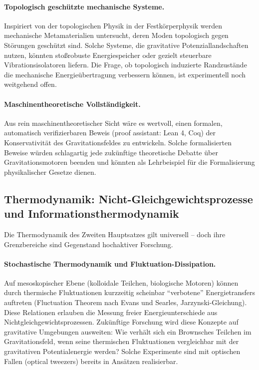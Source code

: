 ﻿\documentclass[12pt, a4paper]{report}
\theoremstyle{definition}
\theoremstyle{remark}
\begin{document}
\paragraph{Topologisch geschützte mechanische Systeme.}
Inspiriert von der topologischen Physik in der Festkörperphysik werden
mechanische Metamaterialien untersucht, deren Moden topologisch gegen
Störungen geschützt sind. Solche Systeme, die gravitative Potenziallandschaften
nutzen, könnten stoßrobuste Energiespeicher oder gezielt steuerbare
Vibrationsisolatoren liefern. Die Frage, ob topologisch induzierte
Randzustände die mechanische Energieübertragung verbessern können, ist
experimentell noch weitgehend offen.

\paragraph{Maschinentheoretische Vollständigkeit.}
Aus rein maschinentheoretischer Sicht wäre es wertvoll, einen formalen,
automatisch verifizierbaren Beweis (proof assistant: Lean 4, Coq) der
Konservativität des Gravitationsfeldes zu entwickeln. Solche formalisierten
Beweise würden schlagartig jede zukünftige theoretische Debatte über
Gravitationsmotoren beenden und könnten als Lehrbeispiel für die
Formalisierung physikalischer Gesetze dienen.

\subsection{Thermodynamik: Nicht-Gleichgewichtsprozesse und
               Informationsthermodynamik}

Die Thermodynamik des Zweiten Hauptsatzes gilt universell -- doch ihre
Grenzbereiche sind Gegenstand hochaktiver Forschung.

\paragraph{Stochastische Thermodynamik und Fluktuation-Dissipation.}
Auf mesoskopischer Ebene (kolloidale Teilchen, biologische Motoren) können
durch thermische Fluktuationen kurzzeitig scheinbar ``verbotene'' Energietransfers
auftreten (Fluctuation Theorem nach Evans und Searles, Jarzynski-Gleichung).
Diese Relationen erlauben die Messung freier Energieunterschiede aus
Nichtgleichgewichtsprozessen. Zukünftige Forschung wird diese Konzepte auf
gravitative Umgebungen ausweiten: Wie verhält sich ein Brownsches Teilchen im
Gravitationsfeld, wenn seine thermischen Fluktuationen vergleichbar mit der
gravitativen Potentialenergie werden? Solche Experimente sind mit optischen
Fallen (optical tweezers) bereits in Ansätzen realisierbar.
\end{document}
